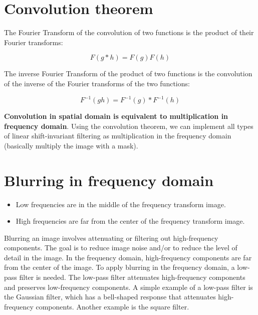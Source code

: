 \documentclass{article}
\begin{document}
\newpage

\section*{Convolution theorem}

The Fourier Transform of the convolution of two functions is the product of their Fourier transforms:

\begin{equation*}
    F(g * h) = F(g)F(h)
\end{equation*}

The inverse Fourier Transform of the product of two functions is the convolution of the inverse of the Fourier transforms of the two functions:

\begin{equation*}
    F^{-1}(gh) = F^{-1}(g) * F^{-1}(h)
\end{equation*}

\textbf{Convolution in spatial domain is equivalent to multiplication in frequency domain}. Using the convolution theorem, we can implement all types of linear shift-invariant filtering as multiplication in the frequency domain (basically multiply the image with a mask).

\section*{Blurring in frequency domain}

\begin{itemize}
    \item Low frequencies are in the middle of the frequency transform image.
    \item High frequencies are far from the center of the frequency transform image. 
\end{itemize}

Blurring an image involves attenuating or filtering out high-frequency components. The goal is to reduce image noise and/or to reduce the level of detail in the image. In the frequency domain, high-frequency components are far from the center of the image. To apply blurring in the frequency domain, a low-pass filter is needed. The low-pass filter attenuates high-frequency components and preserves low-frequency components. A simple example of a low-pass filter is the Gaussian filter, which has a bell-shaped response that attenuates high-frequency components. Another example is the square filter.
\end{document}
